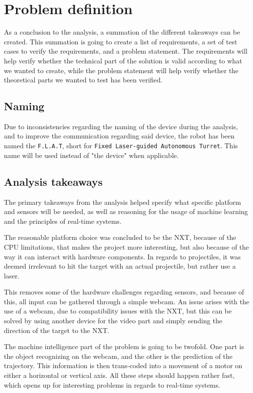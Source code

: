 \newpage
\section{Problem definition}
As a conclusion to the analysis, a summation of the different takeaways can be created. 
This summation is going to create a list of requirements, a set of test cases to verify the requirements, and a problem statement.
The requirements will help verify whether the technical part of the solution is valid according to what we wanted to create, while the problem statement will help verify whether the theoretical parts we wanted to test has been verified.

\subsection{Naming}
Due to inconsistencies regarding the naming of the device during the analysis, and to improve the communication regarding said device, the robot has been named the \texttt{F.L.A.T}, short for \texttt{Fixed Laser-guided Autonomous Turret}.
This name will be used instead of "the device" when applicable.

\subsection{Analysis takeaways}

The primary takeaways from the analysis helped specify what specific platform and sensors will be needed, as well as reasoning for the usage of machine learning and the principles of real-time systems.

The reasonable platform choice was concluded to be the NXT, because of the CPU limitations, that makes the project more interesting, but also because of the way it can interact with hardware components.
In regards to projectiles, it was deemed irrelevant to hit the target with an actual projectile, but rather use a laser.

This removes some of the hardware challenges regarding sensors, and because of this, all input can be gathered through a simple webcam.
An issue arises with the use of a webcam, due to compatibility issues with the NXT, but this can be solved by using another device for the video part and simply sending the direction of the target to the NXT.

The machine intelligence part of the problem is going to be twofold.
One part is the object recognizing on the webcam, and the other is the prediction of the trajectory.
This information is then trans-coded into a movement of a motor on either a horizontal or vertical axis.
All these steps should happen rather fast, which opens up for interesting problems in regards to real-time systems.

